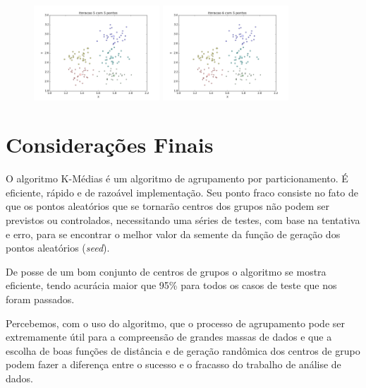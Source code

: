 \documentclass[12pt, a4paper]{article}
\begin{document}
\begin{landscape}
\begin{figure}[!ht]
    \includegraphics[width=0.42\textwidth]{depois_5.png} 
    \includegraphics[width=0.42\textwidth]{depois_6.png}
\end{figure}
\end{landscape}

\section{Considerações Finais}
O algoritmo K-Médias é um algoritmo de agrupamento por particionamento. É eficiente, rápido e de razoável implementação. Seu ponto fraco consiste no fato de que os pontos aleatórios que se tornarão centros dos grupos não podem ser previstos ou controlados, necessitando uma séries de testes, com base na tentativa e erro, para se encontrar o melhor valor da semente da função de geração dos pontos aleatórios (\emph{seed}).

De posse de um bom conjunto de centros de grupos o algoritmo se mostra eficiente, tendo acurácia maior que 95\% para todos os casos de teste que nos foram passados.

Percebemos, com o uso do algoritmo, que o processo de agrupamento pode ser extremamente útil para a compreensão de grandes massas de dados e que a escolha de boas funções de distância e de geração randômica dos centros de grupo podem fazer a diferença entre o sucesso e o fracasso do trabalho de análise de dados.

\newpage

\end{document}
